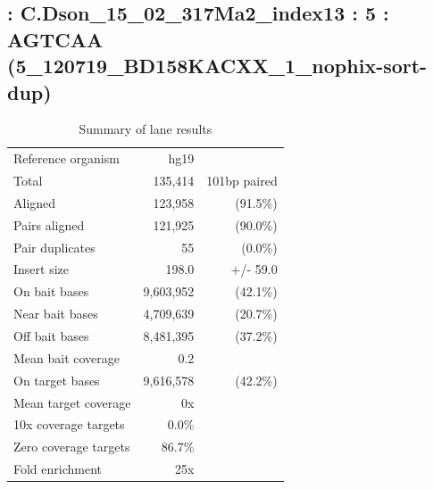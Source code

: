 \documentclass{article}
\begin{document}
    
\subsection*{ : C.Dson\_15\_02\_317Ma2\_index13 : 5 : AGTCAA (5\_120719\_BD158KACXX\_1\_nophix-sort-dup)}

    \begin{table}[h]
    \centering
    \begin{tabular}{|l|rr|}
    \hline
            Reference organism & hg19 &  \\ 
            Total & 135,414 & 101bp paired \\ 
            Aligned & 123,958 & (91.5\%) \\ 
            Pairs aligned & 121,925 & (90.0\%) \\ 
            Pair duplicates & 55 & (0.0\%) \\ 
            Insert size & 198.0 & +/- 59.0 \\ 
            \hline
            On bait bases & 9,603,952 & (42.1\%) \\ 
            Near bait bases & 4,709,639 & (20.7\%) \\ 
            Off bait bases & 8,481,395 & (37.2\%) \\ 
            Mean bait coverage & 0.2 &  \\ 
            On target bases & 9,616,578 & (42.2\%) \\ 
            Mean target coverage & 0x &  \\ 
            10x coverage targets & 0.0\% &  \\ 
            Zero coverage targets & 86.7\% &  \\ 
            Fold enrichment & 25x &  \\ 
    \hline
    \end{tabular}
    \caption{Summary of lane results}
    \end{table}
\end{document}

